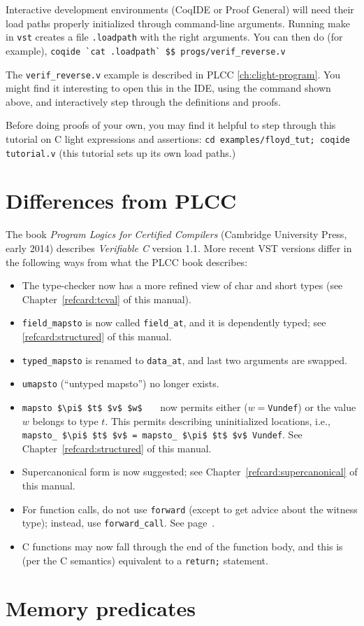 \documentclass[12pt,fleqn,openany,oneside,showtrims]{memoir}
\newcommand{\ychapter}[2]{\chapter[#1]{#1 \hfill \normalsize #2}}
\begin{document}
Interactive development environments (CoqIDE or Proof General)
will need their load paths properly initialized through 
command-line arguments.  Running \textsf{make} in 
\lstinline{vst} creates a file \lstinline{.loadpath} with
the right arguments.  You can then do (for example),
\newline
\lstinline{coqide `cat .loadpath` $$ progs/verif_reverse.v}

The \lstinline{verif_reverse.v} example is described
in PLCC \autoref{ch:clight-program}.
You might find it interesting to open this in the IDE,
using the command shown above,
and interactively step through the definitions and proofs.

Before doing proofs of your own, you may find it helpful
to step through this tutorial on C light expressions and
assertions:\newline
\lstinline{cd examples/floyd_tut; coqide tutorial.v}\newline
(this tutorial sets up its own load paths.)

\ychapter{Differences from PLCC}{}
The book \emph{Program Logics for Certified Compilers}
(Cambridge University Press, early 2014) describes
\emph{Verifiable C} version 1.1.  
More recent VST versions differ in the following ways
from what the PLCC book describes:
\begin{itemize}
\item The type-checker now has a more refined view of char and short types
     (see Chapter~\ref{refcard:tcval} of this manual).
\item \lstinline{field_mapsto} is now called
\lstinline{field_at}, and it is dependently
typed; see \autoref{refcard:structured} of this manual.
\item \lstinline{typed_mapsto} is renamed to \lstinline{data_at}, and
   last two arguments are swapped.
\item \lstinline{umapsto} (``untyped mapsto'') no
longer exists.
\item \lstinline{mapsto $\pi$ $t$ $v$ $w$}
~~~now permits either ($w=$\lstinline{Vundef})
or the value $w$ belongs to type $t$.  
This permits describing uninitialized locations,
i.e., \lstinline{mapsto_ $\pi$ $t$ $v$ = mapsto_ $\pi$ $t$ $v$ Vundef}.
See Chapter~\ref{refcard:structured} of this manual.
\item Supercanonical form is now suggested; see 
Chapter~\ref{refcard:supercanonical} of this manual.
\item For function calls, do not use \lstinline{forward}
(except to get advice about the witness type);
instead, use \lstinline{forward_call}.  See page~\pageref{forward-call}.
\item C functions may now fall through the end of the function body,
and this is (per the C semantics) equivalent to a \lstinline{return;}
statement.
\end{itemize}
\ychapter{Memory predicates}{}
\end{document}
